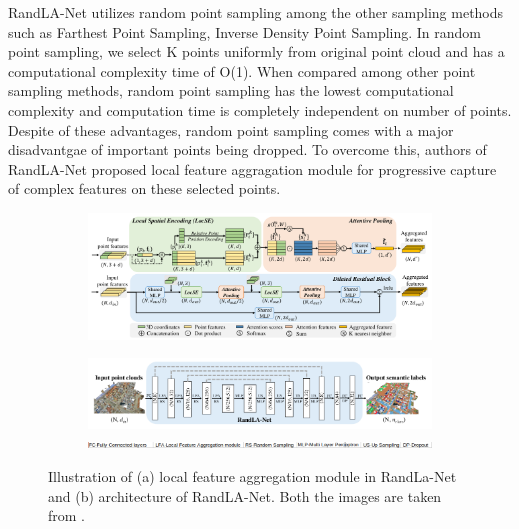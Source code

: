 RandLA-Net utilizes random point sampling among the other sampling methods such as Farthest Point Sampling, Inverse Density Point Sampling.
In random point sampling, we select K points uniformly from original point cloud and has a computational complexity time of O(1).
When compared among other point sampling methods, random point sampling has the lowest computational complexity and computation time is completely independent on number of points.
Despite of these advantages, random point sampling comes with a major disadvantgae of important points being dropped.
To overcome this, authors of RandLA-Net proposed local feature aggragation module for progressive capture of complex features on these selected points.
\begin{figure}
    \centering
    \begin{subfigure}{0.45\textwidth}
        \centering
            \includegraphics[scale=0.4, angle=90]{images/localfeatueaggregation-randlanet.png}
            \caption{}
            \label{fig:randlanetlfa}       
    \end{subfigure}
    \begin{subfigure}{0.45\textwidth}
        \centering
            \includegraphics[scale=0.55, angle=90]{images/randlanet.png}
            \includegraphics[scale=0.55, angle=90]{images/archi_expl.png}
            \caption{}
            \label{fig:networkarchitecture}
    \end{subfigure}
    \caption{Illustration of (a) local feature aggregation module in RandLa-Net and (b) architecture of RandLA-Net. Both the images are taken from \cite{Hu_2020_CVPR_Randla}.}
\end{figure}

